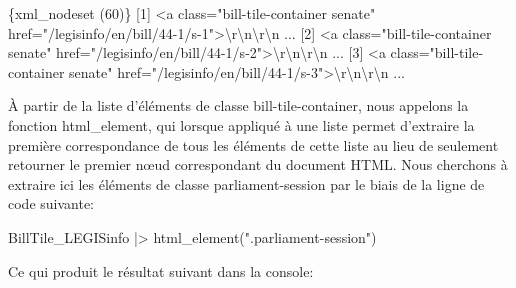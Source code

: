 \documentclass[
  letterpaper,
  DIV=11,
  numbers=noendperiod]{scrreprt}
\newenvironment{Shaded}{\begin{snugshade}}{\end{snugshade}}
\newcommand{\DataTypeTok}[1]{\textcolor[rgb]{0.68,0.00,0.00}{#1}}
\newcommand{\ErrorTok}[1]{\textcolor[rgb]{0.68,0.00,0.00}{#1}}
\newcommand{\ExtensionTok}[1]{\textcolor[rgb]{0.00,0.23,0.31}{#1}}
\newcommand{\KeywordTok}[1]{\textcolor[rgb]{0.00,0.23,0.31}{#1}}
\newcommand{\NormalTok}[1]{\textcolor[rgb]{0.00,0.23,0.31}{#1}}
\newcommand{\OperatorTok}[1]{\textcolor[rgb]{0.37,0.37,0.37}{#1}}
\newcommand{\StringTok}[1]{\textcolor[rgb]{0.13,0.47,0.30}{#1}}
\begin{document}
\begin{Shaded}
\begin{Highlighting}[]
\ExtensionTok{\{xml\_nodeset} \ErrorTok{(}\ExtensionTok{60}\KeywordTok{)}\ErrorTok{\}}
 \ExtensionTok{[1]} \OperatorTok{\textless{}}\NormalTok{a class=}\StringTok{"bill{-}tile{-}container senate"}\NormalTok{ href=}\StringTok{"/legisinfo/en/bill/44{-}1/s{-}1"}\OperatorTok{\textgreater{}}\DataTypeTok{\textbackslash{}r\textbackslash{}n\textbackslash{}r\textbackslash{}n}\NormalTok{     ...}
 \ExtensionTok{[2]} \OperatorTok{\textless{}}\NormalTok{a class=}\StringTok{"bill{-}tile{-}container senate"}\NormalTok{ href=}\StringTok{"/legisinfo/en/bill/44{-}1/s{-}2"}\OperatorTok{\textgreater{}}\DataTypeTok{\textbackslash{}r\textbackslash{}n\textbackslash{}r\textbackslash{}n}\NormalTok{     ...}
 \ExtensionTok{[3]} \OperatorTok{\textless{}}\NormalTok{a class=}\StringTok{"bill{-}tile{-}container senate"}\NormalTok{ href=}\StringTok{"/legisinfo/en/bill/44{-}1/s{-}3"}\OperatorTok{\textgreater{}}\DataTypeTok{\textbackslash{}r\textbackslash{}n\textbackslash{}r\textbackslash{}n}\NormalTok{     ...}
\end{Highlighting}
\end{Shaded}

À partir de la liste d'éléments de classe bill-tile-container, nous
appelons la fonction html\_element, qui lorsque appliqué à une liste
permet d'extraire la première correspondance de tous les éléments de
cette liste au lieu de seulement retourner le premier nœud correspondant
du document HTML. Nous cherchons à extraire ici les éléments de classe
parliament-session par le biais de la ligne de code suivante:

\begin{Shaded}
\begin{Highlighting}[]
\ExtensionTok{BillTile\_LEGISinfo} \KeywordTok{|}\OperatorTok{\textgreater{}}\NormalTok{ html\_element}\KeywordTok{(}\StringTok{".parliament{-}session"}\KeywordTok{)} 
\end{Highlighting}
\end{Shaded}

Ce qui produit le résultat suivant dans la console:
\end{document}
